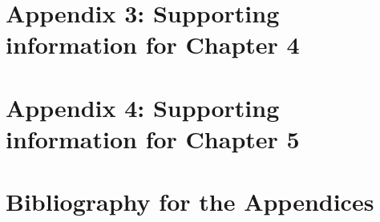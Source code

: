 \documentclass[11pt]{report}
\renewcommand{\baselinestretch}{1.5}
\begin{document}
\begin{refsection}
\chapter*{Appendix 3: Supporting information for Chapter 4}
\setcounter{section}{0}
\setcounter{figure}{0}
\setcounter{table}{0}
\renewcommand{\thefigure}{S4.\arabic{figure}}
\renewcommand{\thetable}{S4.\arabic{table}}
\renewcommand{\thesection}{S4.\arabic{section}}
%


\chapter*{Appendix 4: Supporting information for Chapter 5}
\setcounter{section}{0}
\setcounter{figure}{0}
\setcounter{table}{0}
\renewcommand{\thefigure}{S5.\arabic{figure}}
\renewcommand{\thetable}{S5.\arabic{table}}
\renewcommand{\thesection}{S5.\arabic{section}}



\clearpage
{}
\chapter*{Bibliography for the Appendices}
\renewcommand{\baselinestretch}{1}
\printbibliography[heading=none]
\end{refsection}
\end{document}
